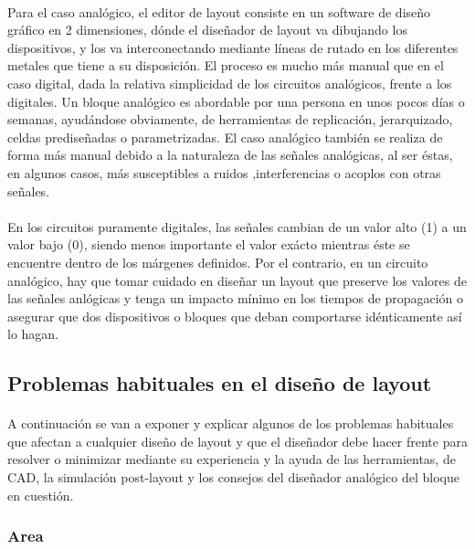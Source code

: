 \paragraph{}
Para el caso analógico, el editor de layout consiste en un software
de diseño gráfico en 2 dimensiones, dónde el diseñador de layout va dibujando los
dispositivos, y los va interconectando mediante líneas de rutado en los diferentes
metales que tiene a su disposición. El proceso es mucho más manual que en el caso
digital, dada la relativa simplicidad de los circuitos analógicos, frente a los
digitales. Un bloque analógico es abordable por una persona en unos pocos días o
semanas, ayudándose obviamente, de herramientas de replicación, jerarquizado, celdas
prediseñadas o parametrizadas. El caso analógico también se realiza de forma más
manual debido a la naturaleza de las señales analógicas, al ser éstas, en algunos casos,
más susceptibles a ruidos ,interferencias o acoplos con otras señales.

\paragraph{}
En los circuitos puramente digitales, las señales cambian de un
valor alto (1) a un valor bajo (0), siendo menos importante el valor exácto
mientras éste se encuentre dentro de los márgenes definidos. Por el contrario,
en un circuito analógico, hay que tomar cuidado en diseñar un layout que preserve
los valores de las señales anlógicas y tenga un impacto mínimo en los tiempos de
propagación o asegurar que dos dispositivos o bloques que deban comportarse idénticamente
así lo hagan.

\subsection{Problemas habituales en el diseño de layout}

\paragraph{}
A continuación se van a exponer y explicar algunos de los problemas habituales que
afectan a cualquier diseño de layout y que el diseñador debe hacer frente para
resolver o minimizar mediante su experiencia y la ayuda de las herramientas, de CAD,
la simulación post-layout y los consejos del diseñador analógico del bloque en cuestión.

\subsubsection{Area}

